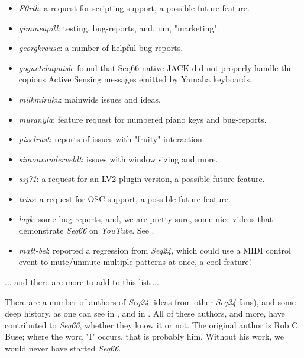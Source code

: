    \begin{itemize}
      \item \textsl{F0rth}:
         a request for scripting support, a possible future feature.
      \item \textsl{gimmeapill}:
         testing, bug-reports, and, um, "marketing".
      \item \textsl{georgkrause}:
         a number of helpful bug reports.
      \item \textsl{goguetchapuisb}:
         found that Seq66 native JACK did not properly handle the copious
         Active Sensing messages emitted by Yamaha keyboards.
      \item \textsl{milkmiruku}:
         mainwids issues and ideas.
      \item \textsl{muranyia}:
         feature request for numbered piano keys and bug-reports.
      \item \textsl{pixelrust}:
         reports of issues with "fruity" interaction.
      \item \textsl{simonvanderveldt}:
         issues with window sizing and more.
      \item \textsl{ssj71}:
         a request for an LV2 plugin version, a possible future feature.
      \item \textsl{triss}:
         a request for OSC support, a possible future feature.
      \item \textsl{layk}:
         some bug reports, and, we are pretty sure, some nice videos that
         demonstrate \textsl{Seq66} on \textsl{YouTube}.  See
         \cite{layk}.
      \item \textsl{matt-bel}:
         reported a regression from \textsl{Seq24}, which could use
         a MIDI control event to mute/unmute multiple patterns at once,
         a cool feature!
         
   \end{itemize}

   ... and there are more to add to this list....

   There are a number of authors of \textsl{Seq24}.
   ideas from other \textsl{Seq24} fans),
   and some deep history,
   as one can see in ,
   and in .
   All of these authors, and more, have contributed to \textsl{Seq66},
   whether they know it or not.
   The original author is Rob C. Buse; where the word "I" occurs, that is
   probably him.  Without his work, we would never have started
   \textsl{Seq66}.

